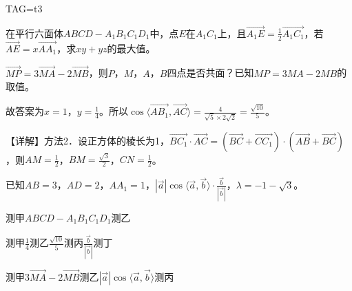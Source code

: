 \documentclass[fontset=none]{ctexart}
\begin{document}
\noindent TAG=t3

\noindent 在平行六面体\(ABCD-A_1B_1C_1D_1\)中，点\(E\)在\(A_1C_1\)上，且\(\overrightarrow{A_1E}=\frac{1}{2}\overrightarrow{A_1C_1}\)，若\(\overrightarrow{AE}=x\overrightarrow{AA_1}\)，求\(xy+yz\)的最大值。

\noindent \(\overrightarrow{MP}=3\overrightarrow{MA}-2\overrightarrow{MB}\)，则\(P\)，\(M\)，\(A\)，\(B\)四点是否共面？已知\(MP=3MA-2MB\)的取值。

\noindent 故答案为\(x=1\)，\(y=\frac{1}{4}\)。所以\(\cos\langle \overrightarrow{AB_1},\overrightarrow{AC}\rangle=\frac{4}{\sqrt{5}\times2\sqrt{2}}=\frac{\sqrt{10}}{5}\)。

\noindent 【详解】方法2．设正方体的棱长为1，\(\overrightarrow{BC_{1}} \cdot \overrightarrow{AC} = ( \overrightarrow{BC} + \overrightarrow{CC_{1}} ) \cdot ( \overrightarrow{AB} + \overrightarrow{BC} )\)，则\(AM = \frac{1}{2}\)，\(BM = \frac{\sqrt{3}}{2}\)，\(CN = \frac{1}{2}\)。

\noindent 已知\(AB=3\)，\(AD=2\)，\(AA_1=1\)，\(| \overrightarrow{a} |\cos\langle \overrightarrow{a},\overrightarrow{b} \rangle \cdot \frac{\overrightarrow{b}}{| \overrightarrow{b} |}\)，\(\lambda=-1-\sqrt{3}\)。

\noindent 测甲\(ABCD-A_1B_1C_1D_1\)测乙

\noindent 测甲\(\frac{1}{4}\)测乙\(\frac{\sqrt{10}}{5}\)测丙\(\frac{\overrightarrow{b}}{| \overrightarrow{b} |}\)测丁

\noindent 测甲\(3\overrightarrow{MA}-2\overrightarrow{MB}\)测乙\(| \overrightarrow{a} |\cos\langle \overrightarrow{a},\overrightarrow{b} \rangle\)测丙
\end{document}
